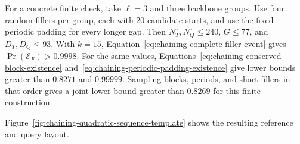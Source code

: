 For a concrete finite check, take \(\ell=3\) and three backbone groups. Use
four random fillers per group, each with 20 candidate starts, and use the fixed
periodic padding for every longer gap. Then
\(N_T^\circ,N_Q^\circ\leq240\), \(G\leq77\), and
\(D_T,D_Q\leq93\). With \(k=15\),
Equation~\ref{eq:chaining-complete-filler-event} gives
\(\Pr(\mathcal E_F)>0.9998\).
For the same values, Equations~\ref{eq:chaining-conserved-block-existence}
and~\ref{eq:chaining-periodic-padding-existence} give lower bounds greater
than \(0.8271\) and \(0.99999\). Sampling blocks, periods, and short fillers in
that order gives a joint lower bound greater than \(0.8269\) for this finite
construction.

Figure~\ref{fig:chaining-quadratic-sequence-template} shows the resulting
reference and query layout.

